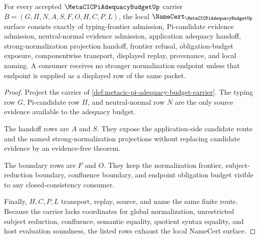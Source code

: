 \begin{theorem}
\label{thm:metacic-pi-adequacy-budget-namecert-obligations}
For every accepted $\MetaCICPiAdequacyBudgetUp$ carrier $B=(G,\Pi,N,A,S,F,O,H,C,P,L)$, the local $\NameCert_{\MetaCICPiAdequacyBudgetUp}$ surface consists exactly of typing-frontier admission, Pi-candidate evidence admission, neutral-normal evidence admission, application adequacy handoff, strong-normalization projection handoff, frontier refusal, obligation-budget exposure, componentwise transport, displayed replay, provenance, and local naming. A consumer receives no stronger normalization endpoint unless that endpoint is supplied as a displayed row of the same packet.
\end{theorem}
\begin{proof}
Project the carrier of \autoref{def:metacic-pi-adequacy-budget-carrier}. The typing row $G$, Pi-candidate row $\Pi$, and neutral-normal row $N$ are the only source evidence available to the adequacy budget.

The handoff rows are $A$ and $S$. They expose the application-side candidate route and the named strong-normalization projections without replacing candidate evidence by an evidence-free theorem.

The boundary rows are $F$ and $O$. They keep the normalization frontier, subject-reduction boundary, confluence boundary, and endpoint obligation budget visible to any closed-consistency consumer.

Finally, $H,C,P,L$ transport, replay, source, and name the same finite route. Because the carrier lacks coordinates for global normalization, unrestricted subject reduction, confluence, semantic equality, quotient syntax equality, and host evaluation soundness, the listed rows exhaust the local NameCert surface.
\end{proof}

